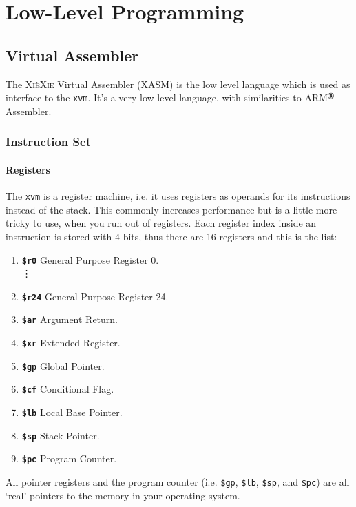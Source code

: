\documentclass[a5paper]{report}
\def\xiexie{\textsc{Xi\`eXie}\xspace}
\def\xvm{\texttt{xvm}\xspace}
\begin{document}
\part{Low-Level Programming}



\chapter{Virtual Assembler}

The \xiexie Virtual Assembler (XASM) is the low level language which is used as interface to the \xvm.
It's a very low level language, with similarities to ARM$^\text{\scriptsize\textregistered}$ Assembler.



\section{Instruction Set}

\subsection{Registers}

The \xvm is a register machine, i.e. it uses registers as operands for its instructions instead of the stack.
This commonly increases performance but is a little more tricky to use, when you run out of registers.
Each register index inside an instruction is stored with 4 bits, thus there are 16 registers and this is the list:
{\small
\begin{enumerate}
	\item \textbf{\texttt{\$r0}} \xspace General Purpose Register 0. \\ \vdots
	\addtocounter{enumi}{23}
	\item \textbf{\texttt{\$r24}} \xspace General Purpose Register 24.
	\item \textbf{\texttt{\$ar}} \xspace Argument Return.
	\item \textbf{\texttt{\$xr}} \xspace Extended Register.
	\item \textbf{\texttt{\$gp}} \xspace Global Pointer.
	\item \textbf{\texttt{\$cf}} \xspace Conditional Flag.
	\item \textbf{\texttt{\$lb}} \xspace Local Base Pointer.
	\item \textbf{\texttt{\$sp}} \xspace Stack Pointer.
	\item \textbf{\texttt{\$pc}} \xspace Program Counter.
\end{enumerate}
}
All pointer registers and the program counter (i.e. \texttt{\$gp}, \texttt{\$lb}, \texttt{\$sp}, and \texttt{\$pc})
are all `real' pointers to the memory in your operating system. 
\end{document}
